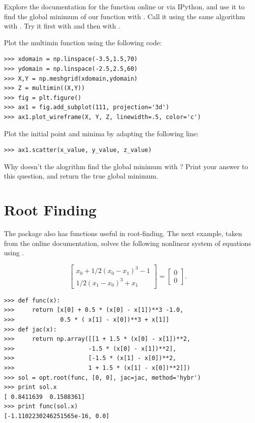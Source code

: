 \begin{problem}
Explore the documentation for the  function online or via IPython, 
and use it to find the global minimum of our  function with .
Call it using the same  algorithm with .
Try it first with  and then with . 

Plot the multimin function using the following code:
\begin{lstlisting}
>>> xdomain = np.linspace(-3.5,1.5,70)
>>> ydomain = np.linspace(-2.5,2.5,60)
>>> X,Y = np.meshgrid(xdomain,ydomain)
>>> Z = multimin((X,Y))
>>> fig = plt.figure()
>>> ax1 = fig.add_subplot(111, projection='3d')
>>> ax1.plot_wireframe(X, Y, Z, linewidth=.5, color='c')
\end{lstlisting}

Plot the initial point and minima by adapting the following line:
\begin{lstlisting}
>>> ax1.scatter(x_value, y_value, z_value)     
\end{lstlisting}

Why doesn't the alogrithm find the global minimum with ?
Print your answer to this question, and return the true global minimum.
\end{problem}

\section*{Root Finding}

The  package also has functions useful in root-finding.
The next example, taken from the online documentation, solves the following nonlinear system of equations using .

\[
\begin{bmatrix}
	x_{0} + 1/2 ( x_{0} - x_{1} )^{3} - 1 \\
	1/2(x_{1}-x_{0})^{3} + x_{1}
\end{bmatrix} =
\begin{bmatrix}
	0 \\
	0
\end{bmatrix}.
\]

\begin{lstlisting}
>>> def func(x):
>>>     return [x[0] + 0.5 * (x[0] - x[1])**3 -1.0,
>>>             0.5 * ( x[1] - x[0])**3 + x[1]]
>>> def jac(x):
>>>     return np.array([[1 + 1.5 * (x[0] - x[1])**2,
>>>                     -1.5 * (x[0] - x[1])**2],
>>>                     [-1.5 * (x[1] - x[0])**2,
>>>                     1 + 1.5 * (x[1] - x[0])**2]])
>>> sol = opt.root(func, [0, 0], jac=jac, method='hybr')
>>> print sol.x
[ 0.8411639  0.1588361]
>>> print func(sol.x)
[-1.1102230246251565e-16, 0.0]
\end{lstlisting}

